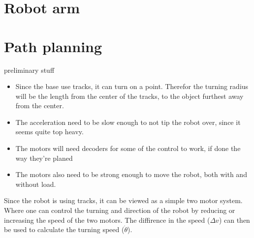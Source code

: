 \section*{Robot arm}
\section*{Path planning}
preliminary stuff
\begin{itemize}
    \item Since the base use tracks, it can turn on a point. Therefor the turning radius will be the length from the center of the tracks, to the object furthest away from the center.
    \item The acceleration need to be slow enough to not tip the robot over, since it seems quite top heavy.
    \item The motors will need decoders for some of the control to work, if done the way they're planed
    \item The motors also need to be strong enough to move the robot, both with and without load.
\end{itemize}

Since the robot is using tracks, it can be viewed as a simple two motor system. Where one can control the turning
 and direction of the robot by reducing or increasing the speed of the two motors. The diffirence in the speed ($\Delta v$)
 can then be used to calculate the turning speed ($\dot{\theta}$).